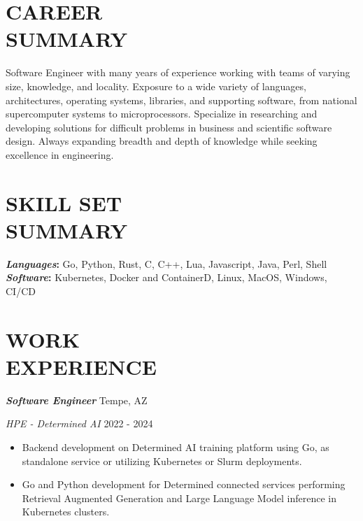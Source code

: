 \documentclass[line,margin]{res}
\renewcommand{\headrulewidth}{0pt} %
\begin{document}
\thispagestyle{empty}


\renewcommand{\headrulewidth}{0pt}

\begin{resume}

  \section{CAREER\\SUMMARY}
  Software Engineer with many years of experience working with teams of varying size, knowledge, and locality.
  Exposure to a wide variety of languages, architectures, operating systems, libraries, and supporting
  software, from national supercomputer systems to microprocessors. Specialize in researching and developing
  solutions for difficult problems in business and scientific software design. Always expanding breadth and
  depth of knowledge while seeking excellence in engineering.

  \section{SKILL SET\\SUMMARY}
          {\bf \emph{Languages}:} Go, Python, Rust, C, C++, Lua, Javascript, Java, Perl, Shell \\
          {\bf \emph{Software}:} Kubernetes, Docker and ContainerD, Linux, MacOS, Windows, CI/CD

  \section{WORK\\EXPERIENCE}
          {\bf \emph{Software Engineer}} \hfill Tempe, AZ

          {\sl HPE - Determined AI} \hfill 2022 - 2024
          \begin{itemize} \itemsep -2pt
          \item
            Backend development on Determined AI training platform using Go, as standalone service or utilizing Kubernetes or Slurm deployments.
          \item
            Go and Python development for Determined connected services performing Retrieval Augmented Generation and Large Language Model inference in Kubernetes clusters.
          \end{itemize}


\end{resume}
\end{document}
